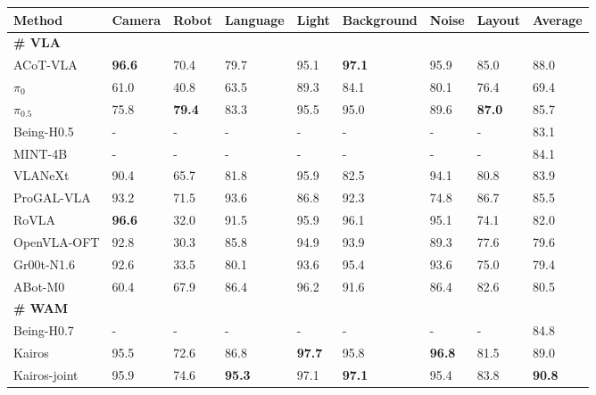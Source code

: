 \begin{table}[t]
{\begin{tabular}{llllllll|l}
\textbf{Method}&       \textbf{Camera}&\textbf{Robot}&\textbf{Language}&\textbf{Light}&\textbf{Background}&\textbf{Noise}&\textbf{Layout}&\textbf{Average}\\
\midrule
\midrule
\textbf{\# VLA}&       &&&&&&&\\
 ACoT-VLA \citep{zhong2026acotvlaactionchainofthoughtvisionlanguageaction}&       \textbf{96.6}&70.4&79.7&95.1&\textbf{97.1}&95.9&85.0&88.0\\
 $\pi_0$ \citep{black2026pi0visionlanguageactionflowmodel}&       61.0&40.8&63.5&89.3&84.1&80.1&76.4&69.4\\
 $\pi_{0.5}$ \citep{intelligence2025pi05visionlanguageactionmodelopenworld}&       75.8&\textbf{79.4}&83.3&95.5&95.0&89.6&\textbf{87.0}&85.7\\
 Being-H0.5 \citep{beingbeyond2026beingh05}&       -&-&-&-&-&-&-&83.1\\
 MINT-4B \citep{huang2026mimicintentjusttrajectories}&       -&-&-&-&-&-&-&84.1\\
 VLANeXt \citep{wu2026vlanextrecipesbuildingstrong}& 90.4& 65.7& 81.8& 95.9& 82.5& 94.1& 80.8 &83.9\\
  ProGAL-VLA \citep{darabi2026progalvlagroundedalignmentprospective}& 93.2& 71.5& 93.6& 86.8& 92.3&  74.8& 86.7&85.5\\
 RoVLA \citep{luo2026rovlamulticonsistencyconstraintsrobust}& \textbf{96.6}& 32.0& 91.5& 95.9& 96.1& 95.1& 74.1&82.0\\
 OpenVLA-OFT \citep{kim2025finetuningvisionlanguageactionmodelsoptimizing}&  92.8&  30.3& 85.8 & 94.9 & 93.9 & 89.3 & 77.6&79.6\\
 Gr00t-N1.6 \citep{nvidia2025gr00tn1openfoundation}& 92.6& 33.5& 80.1& 93.6& 95.4& 93.6& 75.0 &79.4\\
 ABot-M0 \citep{yang2026abotm0vlafoundationmodel}& 60.4& 67.9& 86.4 & 96.2 & 91.6& 86.4& 82.6&80.5\\
 \midrule
 \midrule
 \textbf{\# WAM}&       &&&&&&&\\
 Being-H0.7 \citep{beingbeyond2026beingh07}&       -&-&-&-&-&-&-&84.8\\
 \midrule
 \midrule
\rowcolor{gray!20} Kairos&       95.5&72.6&86.8&\textbf{97.7}&95.8&\textbf{96.8}&81.5&89.0\\
\rowcolor{gray!20} Kairos-joint&       95.9&74.6&\textbf{95.3}&97.1&\textbf{97.1}&95.4&83.8&\textbf{90.8}\\
\bottomrule
\end{tabular}
%
}
\end{table}

